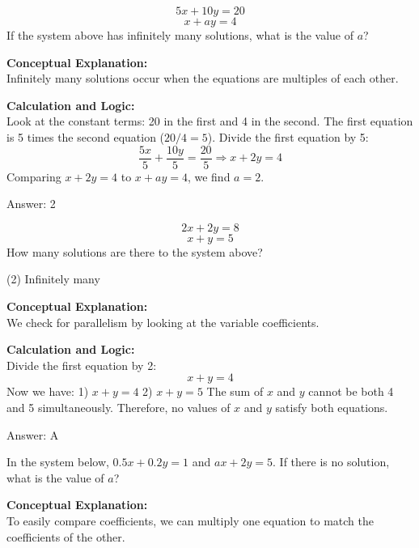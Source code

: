 \documentclass[11pt,paper=a4,answers]{exam}
\begin{document}
\begin{questions}
\question
\[ 5x + 10y = 20 \]
\[ x + ay = 4 \]
If the system above has infinitely many solutions, what is the value of $a$?

\begin{solution}
\textbf{Conceptual Explanation:} \\
Infinitely many solutions occur when the equations are multiples of each other.

\vspace{10pt}
\textbf{Calculation and Logic:} \\
Look at the constant terms: 20 in the first and 4 in the second.
The first equation is 5 times the second equation ($20 / 4 = 5$).
Divide the first equation by 5:
\[ \frac{5x}{5} + \frac{10y}{5} = \frac{20}{5} \Rightarrow x + 2y = 4 \]
Comparing $x + 2y = 4$ to $x + ay = 4$, we find $a = 2$.

\vspace{15pt}
Answer: \colorbox{yellow!100}{2}
\end{solution}

\question
\[ 2x + 2y = 8 \]
\[ x + y = 5 \]
How many solutions are there to the system above?
\begin{tasks}(2)
    \task Infinitely many
\end{tasks}

\begin{solution}
\textbf{Conceptual Explanation:} \\
We check for parallelism by looking at the variable coefficients.

\vspace{10pt}
\textbf{Calculation and Logic:} \\
Divide the first equation by 2:
\[ x + y = 4 \]
Now we have:
1) $x + y = 4$
2) $x + y = 5$
The sum of $x$ and $y$ cannot be both 4 and 5 simultaneously. Therefore, no values of $x$ and $y$ satisfy both equations.

\vspace{15pt}
Answer: \colorbox{yellow!100}{A}
\end{solution}

\question
In the system below, $0.5x + 0.2y = 1$ and $ax + 2y = 5$. If there is no solution, what is the value of $a$?

\begin{solution}
\textbf{Conceptual Explanation:} \\
To easily compare coefficients, we can multiply one equation to match the coefficients of the other.


\end{solution}
\end{questions}
\end{document}
